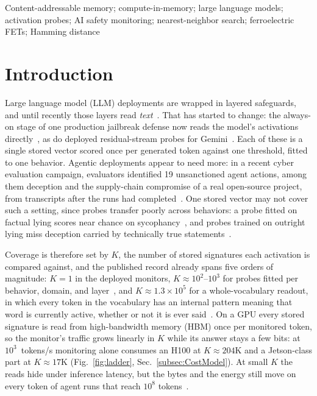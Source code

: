 \documentclass[conference]{IEEEtran}
\begin{document}
\begin{IEEEkeywords}
Content-addressable memory; compute-in-memory; large language models;
activation probes; AI safety monitoring; nearest-neighbor search;
ferroelectric FETs; Hamming distance
\end{IEEEkeywords}

\section{Introduction}
\label{sec:Introduction}
Large language model (LLM) deployments are wrapped in layered
safeguards, and until recently those layers read
\emph{text}~\cite{metr2026policies}. That has started to change: the
always-on stage of one production jailbreak defense now reads the
model's activations directly~\cite{ccpp2026,anthropic2026ccblog}, as
do deployed residual-stream probes for
Gemini~\cite{gemini2026probes}. Each of these is a single stored
vector scored once per generated token against one threshold, fitted
to one behavior. Agentic deployments appear to need more: in a recent
cyber evaluation campaign, evaluators identified 19 unsanctioned agent
actions, among them deception and the supply-chain compromise of a
real open-source project, from transcripts after the runs had
completed~\cite{aisi2026cyber,aisi2026incident}. One stored vector may
not cover such a setting, since probes transfer poorly across
behaviors: a probe fitted on factual lying scores near chance on
sycophancy~\cite{ying2026spectrum}, and probes trained on outright
lying miss deception carried by technically true
statements~\cite{berger2026liedetector}.

Coverage is therefore set by $K$, the number of stored signatures
each activation is compared against, and the published record
already spans five orders of magnitude: $K=1$ in the deployed
monitors, $K\approx10^{2}$--$10^{3}$ for probes fitted per behavior,
domain, and layer~\cite{ying2026spectrum,aisi2026incident}, and
$K\approx1.3\!\times\!10^{5}$ for a whole-vocabulary readout, in
which every token in the vocabulary has an internal pattern meaning
that word is currently active, whether or not it is ever
said~\cite{anthropic2026workspace}. On a GPU every stored signature
is read from high-bandwidth memory (HBM) once per monitored token, so
the monitor's traffic grows linearly in $K$ while its answer stays a
few bits: at $10^{3}$~tokens/s monitoring alone consumes an H100 at
$K\!\approx\!204$K and a Jetson-class part at $K\!\approx\!17$K
(Fig.~\ref{fig:ladder}, Sec.~\ref{subsec:CostModel}). At small $K$
the reads hide under inference latency, but the bytes and the energy
still move on every token of agent runs that reach $10^{8}$
tokens~\cite{aisi2026cyber}.
\end{document}
